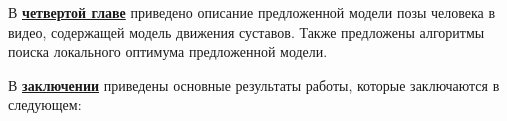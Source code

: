 В \underline{\textbf{четвертой главе}} приведено описание предложенной модели позы человека в видео, содержащей модель движения суставов. Также предложены алгоритмы поиска локального оптимума предложенной модели.

В \underline{\textbf{заключении}} приведены основные результаты работы, которые заключаются в следующем:


\iffalse
При использовании пакета \verb!biblatex! список публикаций автора по теме
диссертации формируется в разделе <<\publications>>\ файла
\verb!../common/characteristic.tex!  при помощи команды \verb!\nocite! 
\fi


